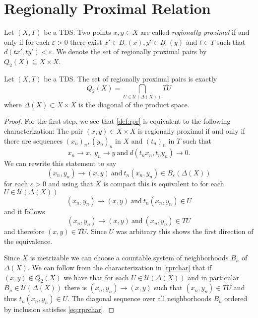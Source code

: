 \section{Regionally Proximal Relation}

\begin{definition}
  \label{def:rpr}
  Let $(X, T)$ be a TDS.
  Two points $x,y \in X$ are called \emph{regionally proximal}
  if and only if for each $\varepsilon > 0$ there exist $x' \in B_\varepsilon(x), y' \in B_\varepsilon(y)$
  and $t \in T$ such that $d(tx', ty') < \varepsilon$.
  We denote the set of regionally proximal pairs by $Q_2(X) \subseteq X \times X$.
\end{definition}


\begin{theorem}
  \label{rprchar}
  Let $(X, T)$ be a TDS.
  The set of regionally proximal pairs is exactly
  \[ Q_2(X) = \bigcap_{U \in \mathcal{U}(\Delta(X))} \overline{TU}  \]
  where $\Delta(X) \subset X \times X$ is the diagonal of the product space.
\end{theorem}

\begin{proof}
  For the first step, we see that \cref{def:rpr} is equivalent to the following characterization:
  The pair $(x, y) \in X \times X$ is regionally proximal if and only if there are sequences $(x_n)_n, (y_n)_n$ in $X$ and $(t_n)_n$ in $T$
  such that
  \begin{equation}
    \label{eq:rprchar}
    x_n \to x, \ y_n \to y \ \text{and} \ d(t_n x_n, t_n y_n) \to 0.
  \end{equation}
  We can rewrite this statement to say
  \[ (x_n, y_n) \to (x, y) \ \text{and} \ t_n(x_n, y_n) \in B_\varepsilon(\Delta(X)) \]
  for each $\varepsilon > 0$ and using that $X$ is compact this is equivalent to for each $U \in \mathcal{U}(\Delta(X))$
  \[ (x_n, y_n) \to (x, y) \ \text{and} \ t_n(x_n, y_n) \in U \]
  and it follows
  \[ (x_n, y_n) \to (x, y) \ \text{and} \ (x_n, y_n) \in TU \]
  and therefore $(x, y) \in \overline{TU}$.
  Since $U$ was arbitrary this shows the first direction of the equivalence.

  Since $X$ is metrizable we can choose a countable system of neighborhoods $B_n$ of $\Delta(X)$.
  We can follow from the characterization in \cref{rprchar} that if $(x, y) \in Q_2(X)$
  we have that for each $U \in \mathcal{U}(\Delta(X))$ and in particular $B_n \in \mathcal{U}(\Delta(X))$
  there is $(x_n, y_n) \to (x, y)$ such that $(x_n, y_n) \in TU$ and thus $t_n(x_n, y_n) \in U$.
  The diagonal sequence over all neighborhoods $B_n$ ordered by inclusion satisfies \ref{eq:rprchar}.
\end{proof}

